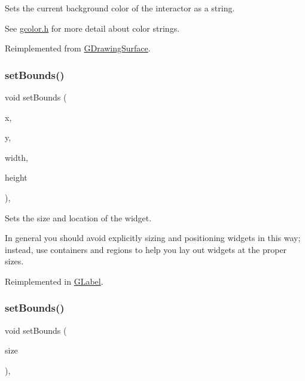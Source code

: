 Sets the current background color of the interactor as a string. 

See \mbox{\hyperlink{gcolor_8h_source}{gcolor.\+h}} for more detail about color strings. 

Reimplemented from \mbox{\hyperlink{classsgl_1_1GDrawingSurface_ab4677ab2474e68b07aa56605af92a84a}{G\+Drawing\+Surface}}.

\mbox{\label{classsgl_1_1GInteractor_a2aae8197624b72265ab83b4f1bc73f2f}} 
\subsubsection{\texorpdfstring{set\+Bounds()}{setBounds()}\hspace{0.1cm}{\footnotesize\ttfamily [1/2]}}
{\footnotesize\ttfamily void set\+Bounds (\begin{DoxyParamCaption}\item[{double}]{x,  }\item[{double}]{y,  }\item[{double}]{width,  }\item[{double}]{height }\end{DoxyParamCaption})\hspace{0.3cm}{\ttfamily [virtual]}, {\ttfamily [inherited]}}



Sets the size and location of the widget. 

In general you should avoid explicitly sizing and positioning widgets in this way; instead, use containers and regions to help you lay out widgets at the proper sizes. 

Reimplemented in \mbox{\hyperlink{classsgl_1_1GLabel_ab9f89f193ad29d66c547cfee29ffde39}{G\+Label}}.

\mbox{\label{classsgl_1_1GInteractor_acada386653f008cacc7cce86426bef7c}} 
\subsubsection{\texorpdfstring{set\+Bounds()}{setBounds()}\hspace{0.1cm}{\footnotesize\ttfamily [2/2]}}
{\footnotesize\ttfamily void set\+Bounds (\begin{DoxyParamCaption}\item[{const \mbox{\hyperlink{structsgl_1_1GRectangle}{G\+Rectangle}} \&}]{size }\end{DoxyParamCaption})\hspace{0.3cm}{\ttfamily [virtual]}, {\ttfamily [inherited]}}



